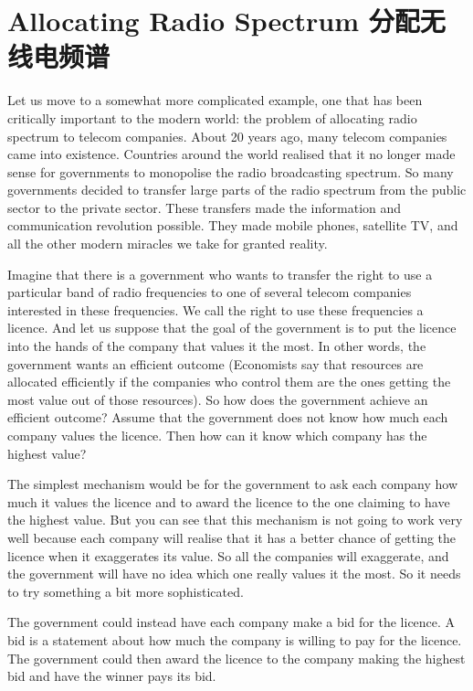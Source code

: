\documentclass[12pt,a4paper]{article}
\newenvironment{original}{%
  \par\vspace{4pt}\noindent%
  \color{black}%
  \ignorespaces
}{%
  \par\vspace{2pt}%
}
\begin{document}
\section{Allocating Radio Spectrum \hfill 分配无线电频谱}

\begin{original}
Let us move to a somewhat more complicated example, one that has been critically important to the modern world: the problem of allocating radio spectrum to telecom companies. About 20 years ago, many telecom companies came into existence. Countries around the world realised that it no longer made sense for governments to monopolise the radio broadcasting spectrum. So many governments decided to transfer large parts of the radio spectrum from the public sector to the private sector. These transfers made the information and communication revolution possible. They made mobile phones, satellite TV, and all the other modern miracles we take for granted reality.

Imagine that there is a government who wants to transfer the right to use a particular band of radio frequencies to one of several telecom companies interested in these frequencies. We call the right to use these frequencies a licence. And let us suppose that the goal of the government is to put the licence into the hands of the company that values it the most. In other words, the government wants an efficient outcome (Economists say that resources are allocated efficiently if the companies who control them are the ones getting the most value out of those resources). So how does the government achieve an efficient outcome? Assume that the government does not know how much each company values the licence. Then how can it know which company has the highest value?

The simplest mechanism would be for the government to ask each company how much it values the licence and to award the licence to the one claiming to have the highest value. But you can see that this mechanism is not going to work very well because each company will realise that it has a better chance of getting the licence when it exaggerates its value. So all the companies will exaggerate, and the government will have no idea which one really values it the most. So it needs to try something a bit more sophisticated.

The government could instead have each company make a bid for the licence. A bid is a statement about how much the company is willing to pay for the licence. The government could then award the licence to the company making the highest bid and have the winner pays its bid.


\end{original}
\end{document}
